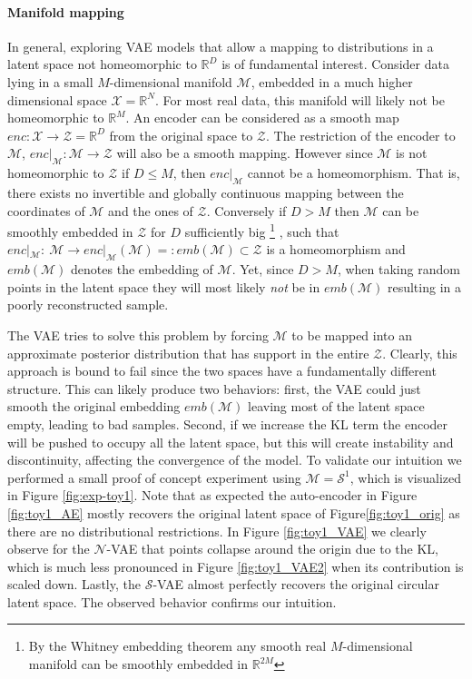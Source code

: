 \documentclass[letterpaper]{article}
\newcommand{\Sv}{$\mathcal{S}$}
\newcommand{\Nv}{$\mathcal{N}$}
\begin{document}
\paragraph{Manifold mapping}\label{par:manifold}
In general, exploring VAE models that allow a mapping to distributions in a latent space not homeomorphic to $\mathbb{R}^D$ is of fundamental interest. Consider data lying in a small $M$-dimensional manifold $\mathcal{M}$, embedded in a much higher dimensional space $\mathcal{X} = \mathbb{R}^N$. For most real data, this manifold will likely not be homeomorphic to $\mathbb{R}^{M}$. An encoder can be considered as a smooth map $enc : \mathcal{X} \to \mathcal{Z}  = \mathbb{R}^{D}$ from the original space to $\mathcal{Z}$. The restriction of the encoder to $\mathcal{M}$, $enc|_\mathcal{M} : \mathcal{M} \to \mathcal{Z}$ will also be a smooth mapping. However since $\mathcal{M}$ is not homeomorphic to $\mathcal{Z}$ if $D \le M$, then $enc|_\mathcal{M}$ cannot be a homeomorphism. That is, there exists no invertible and globally continuous mapping between the coordinates of $\mathcal{M}$ and the ones of $\mathcal{Z}$. Conversely if $D > M$ then $\mathcal{M}$ can be smoothly embedded in $\mathcal{Z}$ for $D$ sufficiently big
\footnote{By the Whitney embedding theorem any smooth real $M$-dimensional manifold can be smoothly embedded in $\mathbb{R}^{2M}$}
, such that $enc|_\mathcal{M}:\ \mathcal{M} \to enc|_\mathcal{M}(\mathcal{M})=: emb(\mathcal{M})\subset\mathcal{Z}$ is a homeomorphism and $emb(\mathcal{M})$ denotes the embedding of $\mathcal{M}$. Yet, since $D > M$, when taking random points in the latent space they will most likely \textit{not} be in $emb(\mathcal{M})$ resulting in a poorly reconstructed sample. 
 
The VAE tries to solve this problem by forcing $\mathcal{M}$ to be mapped into an approximate posterior distribution that has support in the entire $\mathcal{Z}$. Clearly, this approach is bound to fail since the two spaces have a fundamentally different structure. This can likely produce two behaviors: first, the VAE could just smooth the original embedding $emb(\mathcal{M})$ leaving most of the latent space empty, leading to bad samples. Second, if we increase the KL term the encoder will be pushed to occupy all the latent space, but this will create instability and discontinuity, affecting the convergence of the model. To validate our intuition we performed a small proof of concept experiment using $\mathcal{M} = \mathcal{S}^1$, which is visualized in Figure \ref{fig:exp-toy1}. Note that as expected the auto-encoder in Figure \ref{fig:toy1_AE} mostly recovers the original latent space of Figure\ref{fig:toy1_orig} as there are no distributional restrictions. In Figure \ref{fig:toy1_VAE} we clearly observe for the \Nv-VAE that points collapse around the origin due to the KL, which is much less pronounced in Figure \ref{fig:toy1_VAE2} when its contribution is scaled down. Lastly, the \Sv-VAE almost perfectly recovers the original circular latent space. The observed behavior confirms our intuition. 
\end{document}
